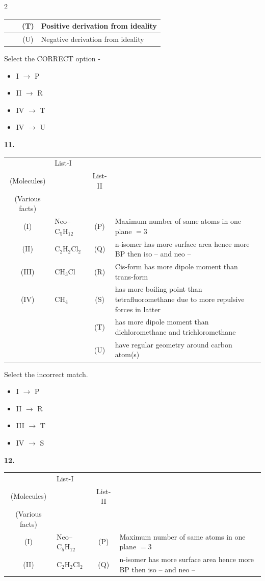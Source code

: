 \documentclass[10pt]{extarticle}
\newcommand{\qn}[1]{\par\smallskip\noindent\textbf{#1.}~}
\newenvironment{qoptions}{\begin{itemize}[leftmargin=1.8em,itemsep=1pt,topsep=2pt,label={}]}{\end{itemize}}
\newcommand{\opt}[2]{\item[(#1)] #2}
\begin{document}
\begin{multicols}{2}
\begin{center}
{\begin{tabular}{|c|p{3.4cm}|c|p{3.4cm}|}
 & & (T) & Positive derivation from ideality\\\hline
 & & (U) & Negative derivation from ideality\\\hline
\end{tabular}}
\end{center}
Select the CORRECT option -
\begin{qoptions}
\opt{A}{I $\to$ P}
\opt{B}{II $\to$ R}
\opt{C}{IV $\to$ T}
\opt{D}{IV $\to$ U}
\end{qoptions}
\qn{11} 
\begin{center}
{\footnotesize\setlength{\tabcolsep}{2pt}\begin{tabular}{|c|p{1.6cm}|c|p{4.2cm}|}\hline
 & \centering List-I\\(Molecules) & & \centering List-II\\(Various facts)\tabularnewline\hline
(I) & Neo--$\mathrm{C_5H_{12}}$ & (P) & Maximum number of same atoms in one plane $=3$\\\hline
(II) & $\mathrm{C_2H_2Cl_2}$ & (Q) & n-isomer has more surface area hence more BP then iso -- and neo --\\\hline
(III) & $\mathrm{CH_3Cl}$ & (R) & Cis-form has more dipole moment than trans-form\\\hline
(IV) & $\mathrm{CH_4}$ & (S) & has more boiling point than tetrafluoromethane due to more repulsive forces in latter\\\hline
 & & (T) & has more dipole moment than dichloromethane and trichloromethane\\\hline
 & & (U) & have regular geometry around carbon atom(s)\\\hline
\end{tabular}}
\end{center}
Select the incorrect match.
\begin{qoptions}
\opt{A}{I $\to$ P}
\opt{B}{II $\to$ R}
\opt{C}{III $\to$ T}
\opt{D}{IV $\to$ S}
\end{qoptions}
\qn{12} 
\begin{center}
{\footnotesize\setlength{\tabcolsep}{2pt}\begin{tabular}{|c|p{1.6cm}|c|p{4.2cm}|}\hline
 & \centering List-I\\(Molecules) & & \centering List-II\\(Various facts)\tabularnewline\hline
(I) & Neo--$\mathrm{C_5H_{12}}$ & (P) & Maximum number of same atoms in one plane $=3$\\\hline
(II) & $\mathrm{C_2H_2Cl_2}$ & (Q) & n-isomer has more surface area hence more BP then iso -- and neo --\\\hline

\end{tabular}}
\end{center}
\end{multicols}
\end{document}
